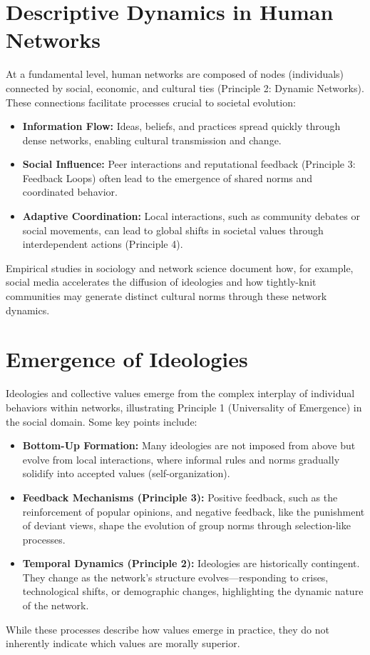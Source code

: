 \documentclass[12pt,openany]{book}
\begin{document}
\section{Descriptive Dynamics in Human Networks}
At a fundamental level, human networks are composed of nodes (individuals) connected by social, economic, and cultural ties (Principle 2: Dynamic Networks). These connections facilitate processes crucial to societal evolution:
\begin{itemize}
    \item \textbf{Information Flow:} Ideas, beliefs, and practices spread quickly through dense networks, enabling cultural transmission and change.
    \item \textbf{Social Influence:} Peer interactions and reputational feedback (Principle 3: Feedback Loops) often lead to the emergence of shared norms and coordinated behavior.
    \item \textbf{Adaptive Coordination:} Local interactions, such as community debates or social movements, can lead to global shifts in societal values through interdependent actions (Principle 4).
\end{itemize}
Empirical studies in sociology and network science document how, for example, social media accelerates the diffusion of ideologies and how tightly-knit communities may generate distinct cultural norms through these network dynamics. %

\section{Emergence of Ideologies}
Ideologies and collective values emerge from the complex interplay of individual behaviors within networks, illustrating Principle 1 (Universality of Emergence) in the social domain. Some key points include:
\begin{itemize}
    \item \textbf{Bottom-Up Formation:} Many ideologies are not imposed from above but evolve from local interactions, where informal rules and norms gradually solidify into accepted values (self-organization).
    \item \textbf{Feedback Mechanisms (Principle 3):} Positive feedback, such as the reinforcement of popular opinions, and negative feedback, like the punishment of deviant views, shape the evolution of group norms through selection-like processes.
    \item \textbf{Temporal Dynamics (Principle 2):} Ideologies are historically contingent. They change as the network’s structure evolves—responding to crises, technological shifts, or demographic changes, highlighting the dynamic nature of the network.
\end{itemize}
While these processes describe how values emerge in practice, they do not inherently indicate which values are morally superior.
\end{document}
